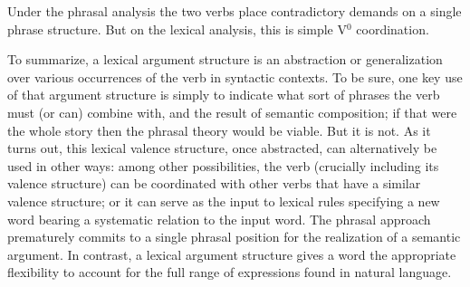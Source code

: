 \documentclass[output=paper]{langsci/langscibook}
\begin{document}
\noindent
Under the phrasal analysis the two verbs place contradictory demands on a single phrase structure.  But on the lexical analysis, this is simple V$^0$ coordination.   
 
To summarize, a lexical argument structure is an abstraction or generalization over various occurrences of the verb in syntactic contexts. To be sure, one key use of that argument structure is simply to indicate what sort of phrases the verb must (or can) combine with, and the result of semantic composition; if that were the whole story then the phrasal theory would be viable. But it is not. As it turns out, this lexical valence structure, once abstracted, can alternatively be used in other ways: among other possibilities, the verb (crucially including its valence structure) can be coordinated with other verbs that have a similar valence structure; or it can serve as the input to lexical rules specifying a new word bearing a systematic relation to the input word.   The phrasal approach prematurely commits to a single phrasal position for the realization of 
a semantic argument.  In contrast, a lexical argument structure gives a word the appropriate flexibility to account for the full range of expressions found in natural language.   
 
 

%
\printbibliography[heading=subbibliography,notkeyword=this] 
\end{document}
